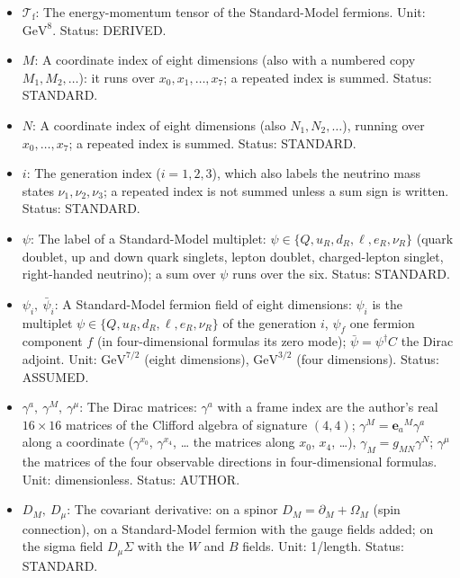 \documentclass[
  10pt,
]{article}
\providecommand{\tightlist}{%
  \setlength{\itemsep}{0pt}\setlength{\parskip}{0pt}}
\begin{document}
\begin{itemize}
\tightlist
\item
  \(\mathcal{T}_{\mathrm{f}}\): The energy-momentum tensor of the
  Standard-Model fermions. Unit: \(\mathrm{GeV}^{8}\). Status: DERIVED.
\item
  \(M\): A coordinate index of eight dimensions (also with a numbered
  copy \(M_1, M_2, \dots\)): it runs over \(x_0, x_1, \dots, x_7\); a
  repeated index is summed. Status: STANDARD.
\item
  \(N\): A coordinate index of eight dimensions (also
  \(N_1, N_2, \dots\)), running over \(x_0, \dots, x_7\); a repeated
  index is summed. Status: STANDARD.
\item
  \(i\): The generation index (\(i = 1, 2, 3\)), which also labels the
  neutrino mass states \(\nu_1, \nu_2, \nu_3\); a repeated index is not
  summed unless a sum sign is written. Status: STANDARD.
\item
  \(\psi\): The label of a Standard-Model multiplet:
  \(\psi \in \{Q, u_R, d_R, \ell, e_R, \nu_R\}\) (quark doublet, up and
  down quark singlets, lepton doublet, charged-lepton singlet,
  right-handed neutrino); a sum over \(\psi\) runs over the six. Status:
  STANDARD.
\item
  \(\psi_i,\ \bar\psi_i\): A Standard-Model fermion field of eight
  dimensions: \(\psi_i\) is the multiplet
  \(\psi \in \{Q, u_R, d_R, \ell, e_R, \nu_R\}\) of the generation
  \(i\), \(\psi_f\) one fermion component \(f\) (in four-dimensional
  formulas its zero mode); \(\bar\psi = \psi^\dagger C\) the Dirac
  adjoint. Unit: \(\mathrm{GeV}^{7/2}\) (eight dimensions),
  \(\mathrm{GeV}^{3/2}\) (four dimensions). Status: ASSUMED.
\item
  \(\gamma^a,\ \gamma^M,\ \gamma^\mu\): The Dirac matrices: \(\gamma^a\)
  with a frame index are the author's real \(16 \times 16\) matrices of
  the Clifford algebra of signature \((4, 4)\);
  \(\gamma^M = \mathbf{e}_a{}^M\gamma^a\) along a coordinate
  (\(\gamma^{x_0}\), \(\gamma^{x_4}\), \ldots{} the matrices along
  \(x_0\), \(x_4\), \ldots), \(\gamma_M = g_{MN}\gamma^N\);
  \(\gamma^\mu\) the matrices of the four observable directions in
  four-dimensional formulas. Unit: dimensionless. Status: AUTHOR.
\item
  \(D_M,\ D_\mu\): The covariant derivative: on a spinor
  \(D_M = \partial_M + \Omega_M\) (spin connection), on a Standard-Model
  fermion with the gauge fields added; on the sigma field
  \(D_\mu\Sigma\) with the \(W\) and \(B\) fields. Unit: 1/length.
  Status: STANDARD.

\end{itemize}
\end{document}
